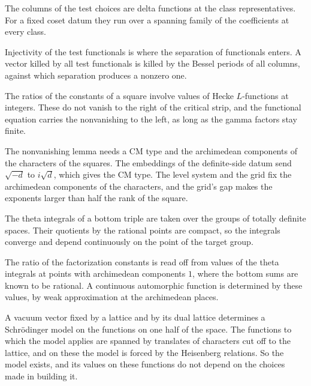 The columns of the test choices are delta functions at the class representatives. For a fixed coset
datum they run over a spanning family of the coefficients at every class.

Injectivity of the test functionals is where the separation of functionals enters. A vector killed
by all test functionals is killed by the Bessel periods of all columns, against which separation
produces a nonzero one.

The ratios of the constants of a square involve values of Hecke $L$-functions at integers. These do
not vanish to the right of the critical strip, and the functional equation carries the nonvanishing
to the left, as long as the gamma factors stay finite.

The nonvanishing lemma needs a CM type and the archimedean components of the characters of the
squares. The embeddings of the definite-side datum send $\sqrt{-d}$ to $i\sqrt d$, which gives the CM
type. The level system and the grid fix the archimedean components of the characters, and the grid's
gap makes the exponents larger than half the rank of the square.

The theta integrals of a bottom triple are taken over the groups of totally definite spaces. Their
quotients by the rational points are compact, so the integrals converge and depend continuously on
the point of the target group.

The ratio of the factorization constants is read off from values of the theta integrals at points
with archimedean components $1$, where the bottom sums are known to be rational. A continuous
automorphic function is determined by these values, by weak approximation at the archimedean places.

A vacuum vector fixed by a lattice and by its dual lattice determines a Schr\"odinger model on the
functions on one half of the space. The functions to which the model applies are spanned by translates of
characters cut off to the lattice, and on these the model is forced by the Heisenberg relations. So the
model exists, and its values on these functions do not depend on the choices made in building it.

